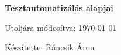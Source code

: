 \begin{titlepage}
	\begin{center}
		{\LARGE\textbf{Tesztautomatizálás alapjai}}
	\end{center}
	\vfill
	\begin{center}
		{\large Utoljára módosítva: \today}
		\vspace{0.5cm}
		
		{Készítette: Ráncsik Áron}
	\end{center}
\end{titlepage}
